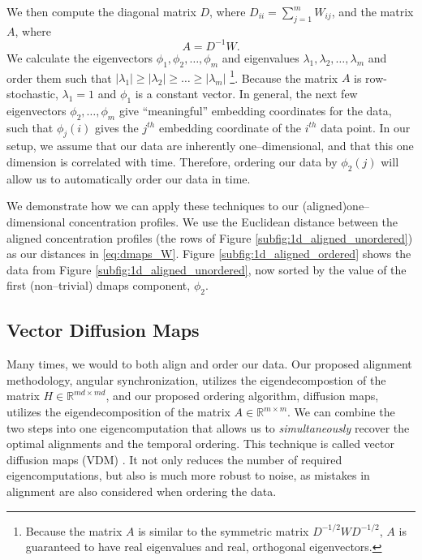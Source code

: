 \documentclass[11pt]{article}
\begin{document}
We then compute the diagonal matrix $D$, where $D_{ii} = \sum_{j=1}^{m} W_{ij}$, and the matrix $A$, where
\begin{equation} \label{eq:dmaps_A}
A = D^{-1} W.
\end{equation} 
%
We calculate the eigenvectors $\phi_1, \phi_2, \dots, \phi_m$ and eigenvalues $\lambda_1, \lambda_2, \dots, \lambda_m$ and order them such that $|\lambda_1| \ge |\lambda_2| \ge \dots \ge |\lambda_m|$ \footnote{Because the matrix $A$ is similar to the symmetric matrix $D^{-1/2} W D^{-1/2}$, $A$ is guaranteed to have real eigenvalues and real, orthogonal eigenvectors.}. 
%
Because the matrix $A$ is row-stochastic, $\lambda_1=1$ and $\phi_1$ is a constant vector.
%
In general, the next few eigenvectors $\phi_2, \dots, \phi_m$ give ``meaningful'' embedding coordinates for the data, such that $\phi_j(i)$ gives the $j^{th}$ embedding coordinate of the $i^{th}$ data point. 
%
In our setup, we assume that our data are inherently one--dimensional, and that this one dimension is correlated with time.
%
Therefore, ordering our data by $\phi_2(j)$ will allow us to automatically order our data in time. 

We demonstrate how we can apply these techniques to our (aligned)one--dimensional concentration profiles. 
%
We use the Euclidean distance between the aligned concentration profiles (the rows of Figure \ref{subfig:1d_aligned_unordered}) as our distances in \eqref{eq:dmaps_W}.
%
Figure \ref{subfig:1d_aligned_ordered} shows the data from Figure \ref{subfig:1d_aligned_unordered}, now sorted by the value of the first (non--trivial) dmaps component, $\phi_2$. 

\subsection{Vector Diffusion Maps}

Many times, we would to both align and order our data.
%
Our proposed alignment methodology, angular synchronization, utilizes the eigendecompostion of the matrix $H \in \mathbb{R}^{md \times md}$, and our proposed ordering algorithm, diffusion maps, utilizes the eigendecomposition of the matrix $A \in \mathbb{R}^{m \times m}$.
%
We can combine the two steps into one eigencomputation that allows us to {\em simultaneously} recover the optimal alignments and the temporal ordering.
%
This technique is called vector diffusion maps (VDM) \cite{singer2012vector}.
%
It not only reduces the number of required eigencomputations, but also is much more robust to noise, as mistakes in alignment are also considered when ordering the data.
\end{document}

